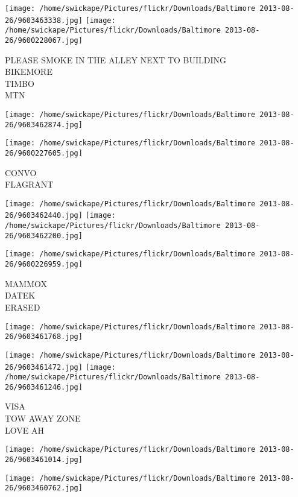 \documentclass[10pt,letterpaper]{article}
\begin{document}
\texttt{[image: /home/swickape/Pictures/flickr/Downloads/Baltimore 2013-08-26/9603463338.jpg]}
\texttt{[image: /home/swickape/Pictures/flickr/Downloads/Baltimore 2013-08-26/9600228067.jpg]}

PLEASE SMOKE IN THE ALLEY NEXT TO BUILDING\\
BIKEMORE\\
TIMBO\\
MTN\\
\pagebreak

\texttt{[image: /home/swickape/Pictures/flickr/Downloads/Baltimore 2013-08-26/9603462874.jpg]}

\vspace{0.25in}
\texttt{[image: /home/swickape/Pictures/flickr/Downloads/Baltimore 2013-08-26/9600227605.jpg]}

CONVO\\
FLAGRANT\\
\pagebreak

\texttt{[image: /home/swickape/Pictures/flickr/Downloads/Baltimore 2013-08-26/9603462440.jpg]}
\texttt{[image: /home/swickape/Pictures/flickr/Downloads/Baltimore 2013-08-26/9603462200.jpg]}

\texttt{[image: /home/swickape/Pictures/flickr/Downloads/Baltimore 2013-08-26/9600226959.jpg]}

MAMMOX\\
DATEK\\
ERASED\\
\pagebreak

\texttt{[image: /home/swickape/Pictures/flickr/Downloads/Baltimore 2013-08-26/9603461768.jpg]}

\vspace{0.25in}
\texttt{[image: /home/swickape/Pictures/flickr/Downloads/Baltimore 2013-08-26/9603461472.jpg]}
\texttt{[image: /home/swickape/Pictures/flickr/Downloads/Baltimore 2013-08-26/9603461246.jpg]}

VISA\\
TOW AWAY ZONE\\
LOVE AH\\
\pagebreak

\texttt{[image: /home/swickape/Pictures/flickr/Downloads/Baltimore 2013-08-26/9603461014.jpg]}

\vspace{0.25in}
\texttt{[image: /home/swickape/Pictures/flickr/Downloads/Baltimore 2013-08-26/9603460762.jpg]}
\end{document}
